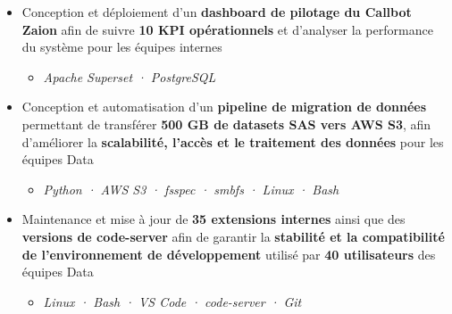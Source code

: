 \documentclass[10pt,english,french]{article}
\begin{document}
\begin{itemize}[leftmargin=0.5cm, label=\textbullet, itemsep=0.0625em]
    \item Conception et déploiement d'un \textbf{dashboard de pilotage du Callbot Zaion}
          afin de suivre \textbf{10\raisebox{0.20ex}{\small +} KPI opérationnels} et
          d'analyser la performance du système pour les équipes internes
          \begin{itemize}[leftmargin=0.25cm,label=\textendash,itemsep=0em,topsep=0.2em]
              \item \textit{\fontsize{10pt}{9pt}\selectfont Apache Superset · PostgreSQL}
          \end{itemize}

    \item Conception et automatisation d'un \textbf{pipeline de migration de données}
          permettant de transférer \textbf{500\raisebox{0.20ex}{\small +} GB de datasets
              SAS vers AWS S3}, afin d'améliorer la \textbf{scalabilité, l'accès et le
              traitement des données} pour les équipes Data
          \begin{itemize}[leftmargin=0.25cm,label=\textendash,itemsep=0em,topsep=0.2em]
              \item \textit{\fontsize{10pt}{9pt}\selectfont Python · AWS S3 · fsspec · smbfs · Linux · Bash}
          \end{itemize}


    \item Maintenance et mise à jour de \textbf{35\raisebox{0.20ex}{\small +} extensions
              internes} ainsi que des \textbf{versions de code-server} afin de garantir la
          \textbf{stabilité et la compatibilité de l'environnement de développement}
          utilisé par \textbf{40\raisebox{0.20ex}{\small +} utilisateurs} des équipes
          Data
          \begin{itemize}[leftmargin=0.25cm,label=\textendash,itemsep=0em,topsep=0.2em]
              \item \textit{\fontsize{10pt}{9pt}\selectfont Linux · Bash · VS Code · code-server · Git}
          \end{itemize}


\end{itemize}
\end{document}
